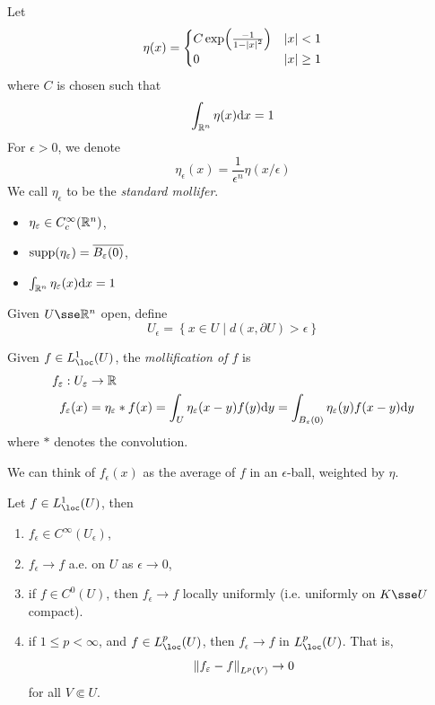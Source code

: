 \documentclass{article}
\begin{document}
\begin{definition}
    Let
    \[\eta(x) = \begin{cases}
        C \exp(\frac{-1}{1-\abs{x}^2}) & \abs{x} < 1 \\
        0 & \abs{x} \ge 1
    \end{cases}\]
    where \(C\) is chosen such that
    \[\int_{\mathbb{R}^n}\eta(x)\dd x = 1\]
    For \(\epsilon > 0\), we denote
    \[\eta_\epsilon(x) = \frac{1}{\epsilon^n}\eta(x/\epsilon)\]
    We call \(\eta_\epsilon\) to be the \emph{standard mollifer}.
\end{definition}

\begin{remark}
    \begin{itemize}
        \item \(\eta_\varepsilon \in C_c^\infty(\mathbb{R}^n)\),
        \item \(\operatorname{supp}(\eta_\varepsilon) = \overline{B_\varepsilon(0)}\),
        \item \(\int_{\mathbb{R}^n}\eta_\varepsilon(x)\dd x = 1\)
    \end{itemize}
\end{remark}

\begin{definition}
    Given \(U \sse \R^n\) open, define
    \[U_\epsilon = \left\{x \in U \mid d(x, \partial U) > \epsilon\right\}\]
\end{definition}

\begin{definition}
    [mollification]
    Given \(f \in L^1_\loc(U)\), the \emph{mollification of \(f\)} is
    \begin{align*}
        f_\varepsilon : U_\varepsilon &\to \mathbb{R} \\
        f_\varepsilon(x) &= \eta_\varepsilon * f(x) = \int_{U}\eta_\varepsilon(x-y)f(y)\dd y = \int_{B_\varepsilon(0)}\eta_\varepsilon(y)f(x-y) \dd y
    \end{align*}
    where \(*\) denotes the convolution.
\end{definition}

We can think of \(f_\epsilon(x)\) as the average of \(f\) in an \(\epsilon\)-ball, weighted by \(\eta\).

\begin{theorem}
    Let \(f \in L^1_\loc(U)\), then
    \begin{enumerate}
        \item \(f_\epsilon \in C^\infty(U_\epsilon)\),
        \item \(f_\epsilon \to f\) a.e. on \(U\) as \(\epsilon\to 0\),
        \item if \(f \in C^0(U)\), then \(f_\epsilon \to f\) locally uniformly (i.e. uniformly on \(K \sse U\) compact).
        \item if \(1 \le p < \infty\), and \(f \in L^p_\loc(U)\), then \(f_\epsilon \to f\) in \(L^p_\loc(U)\). That is,
        \[\norm{f_\varepsilon - f}_{L^p(V)} \to 0\]
        for all \(V \Subset U\).
    \end{enumerate}
\end{theorem}
\end{document}
